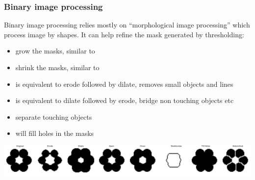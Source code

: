\documentclass[ignorenonframetext,aspectratio=169,10pt,xcolor=table]{beamer}
\begin{document}
\begin{frame} \frametitle{Binary image processing}

  Binary image processing relies mostly on ``morphological image processing''
  which process image by shapes. It can help refine the mask generated by
  thresholding:

  \begin{itemize}
  \item {} grow the masks, similar to
  \item {} shrink the masks, similar to
  \item {} is equivalent to erode followed by
    dilate, removes small objects and lines
  \item {} is equivalent to dilate followed
    by erode, bridge non touching objects etc
  \item {} separate touching objects
  \item {} will fill holes in the masks
  \end{itemize}
  \begin{center} \includegraphics[width=\textwidth]{flower}
  \end{center}
\end{frame}


\end{document}
